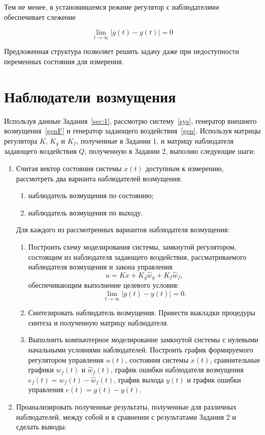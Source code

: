 \documentclass[a4paper,12pt]{article}
\begin{document}
	Тем не менее, в установившемся режиме регулятор с наблюдателями обеспечивает слежение
	
	\[
	\lim_{t \to \infty} |g(t) - y(t)| = 0
	\]
	
Предложенная структура позволяет решить задачу даже при недоступности переменных состояния для измерения.
	
\newpage \section{Наблюдатели возмущения}

Используя данные Задания~\ref{sec:1}, рассмотрю систему~\ref{sys}, генератор внешнего возмущения~\ref{genF} и генератор задающего воздействия~\ref{gen}. Используя матрицы регулятора $K$, $K_g$ и $K_f$, полученные в Задании 1, и матрицу наблюдателя задающего воздействия $Q$, полученную в Задании 2, выполню следующие шаги:

\begin{enumerate}
	\item Считая вектор состояния системы $x(t)$ доступным к измерению, рассмотреть два варианта наблюдателей возмущения:
	\begin{enumerate}
		\item наблюдатель возмущения по состоянию;
		\item наблюдатель возмущения по выходу.
	\end{enumerate}
	
	Для каждого из рассмотренных вариантов наблюдателя возмущения:
	\begin{enumerate}
		\item Построить схему моделирования системы, замкнутой регулятором, состоящим из наблюдателя задающего воздействия, рассматриваемого наблюдателя возмущения и закона управления
		\[
		u = Kx + K_g \hat{w}_g + K_f \hat{w}_f,
		\]
		обеспечивающим выполнение целевого условия:
		\[
		\lim_{t \to \infty} |g(t) - y(t)| = 0.
		\]
		
		\item Синтезировать наблюдатель возмущения. Привести выкладки процедуры синтеза и полученную матрицу наблюдателя.
		
		\item Выполнить компьютерное моделирование замкнутой системы с нулевыми начальными условиями наблюдателей. Построить график формируемого регулятором управления $u(t)$, состояния системы $x(t)$, сравнительные графики $w_f(t)$ и $\hat{w}_f(t)$, график ошибки наблюдателя возмущения $e_f(t) = w_f(t) - \hat{w}_f(t)$, график выхода $y(t)$ и график ошибки управления $e(t) = g(t) - y(t)$.
	\end{enumerate}
	
	\item Проанализировать полученные результаты, полученные для различных наблюдателей, между собой и в сравнении с результатами Задания 2 и сделать выводы.
\end{enumerate}
\end{document}
